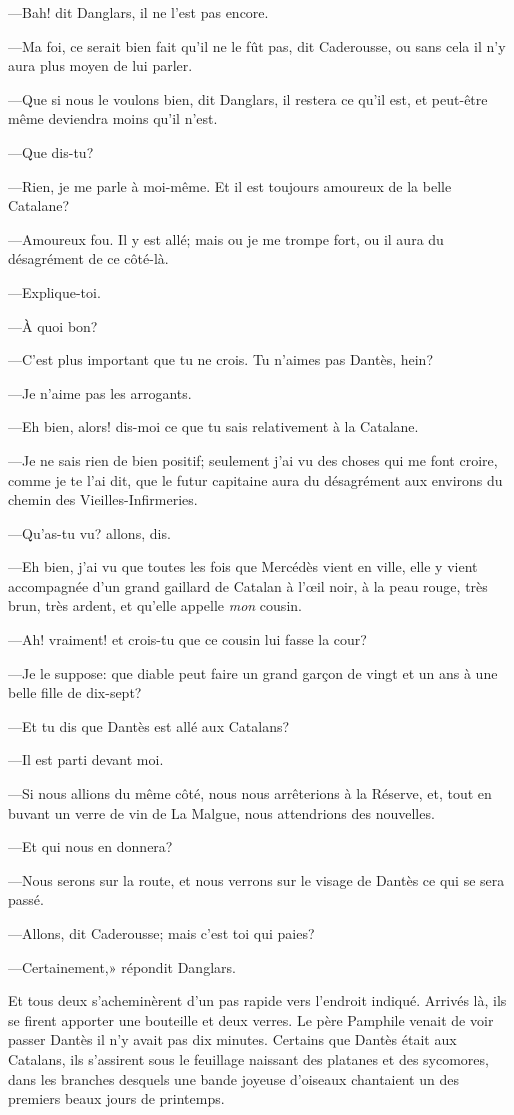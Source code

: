 —Bah! dit Danglars, il ne l'est pas encore.

—Ma foi, ce serait bien fait qu'il ne le fût pas, dit Caderousse, ou sans cela il n'y aura plus moyen de lui parler.

—Que si nous le voulons bien, dit Danglars, il restera ce qu'il est, et peut-être même deviendra moins qu'il n'est.

—Que dis-tu?

—Rien, je me parle à moi-même. Et il est toujours amoureux de la belle Catalane?

—Amoureux fou. Il y est allé; mais ou je me trompe fort, ou il aura du désagrément de ce côté-là.

—Explique-toi.

—À quoi bon?

—C'est plus important que tu ne crois. Tu n'aimes pas Dantès, hein?

—Je n'aime pas les arrogants.

—Eh bien, alors! dis-moi ce que tu sais relativement à la Catalane.

—Je ne sais rien de bien positif; seulement j'ai vu des choses qui me font croire, comme je te l'ai dit, que le futur capitaine aura du désagrément aux environs du chemin des Vieilles-Infirmeries.

—Qu'as-tu vu? allons, dis.

—Eh bien, j'ai vu que toutes les fois que Mercédès vient en ville, elle y vient accompagnée d'un grand gaillard de Catalan à l'œil noir, à la peau rouge, très brun, très ardent, et qu'elle appelle \textit{mon} cousin.

—Ah! vraiment! et crois-tu que ce cousin lui fasse la cour?

—Je le suppose: que diable peut faire un grand garçon de vingt et un ans à une belle fille de dix-sept?

—Et tu dis que Dantès est allé aux Catalans?

—Il est parti devant moi.

—Si nous allions du même côté, nous nous arrêterions à la Réserve, et, tout en buvant un verre de vin de La Malgue, nous attendrions des nouvelles.

—Et qui nous en donnera?

—Nous serons sur la route, et nous verrons sur le visage de Dantès ce qui se sera passé.

—Allons, dit Caderousse; mais c'est toi qui paies?

—Certainement,» répondit Danglars.

Et tous deux s'acheminèrent d'un pas rapide vers l'endroit indiqué. Arrivés là, ils se firent apporter une bouteille et deux verres. Le père Pamphile venait de voir passer Dantès il n'y avait pas dix minutes. Certains que Dantès était aux Catalans, ils s'assirent sous le feuillage naissant des platanes et des sycomores, dans les branches desquels une bande joyeuse d'oiseaux chantaient un des premiers beaux jours de printemps.



